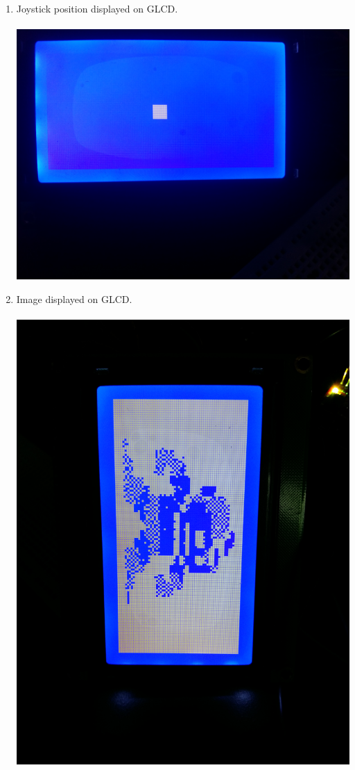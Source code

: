 \documentclass[a4paper,12pt,oneside]{book}
\begin{document}
\begin{enumerate}
\item Joystick position displayed on GLCD.\\~\\
\includegraphics[scale=0.07]{20160708_113016.jpg}
\item Image displayed on GLCD.\\~\\
\includegraphics[scale=0.07]{20160706_152740.jpg}

\end{enumerate}
\end{document}
